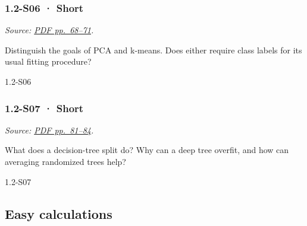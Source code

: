 \noindent\begin{minipage}{\linewidth}

\subsubsection{1.2-S06 · Short}\label{s06-short-1}

\emph{Source:
\href{../Lecture\%20Slides/1.2.\%20Shallow\%20Learning.pdf\#page=68}{PDF
pp.~68--71}.}

Distinguish the goals of PCA and k-means. Does either require class
labels for its usual fitting procedure?

\begin{solution}[20mm]{1.2-S06}

\end{solution}
\end{minipage}\par\medskip

\noindent\begin{minipage}{\linewidth}

\subsubsection{1.2-S07 · Short}\label{s07-short-1}

\emph{Source:
\href{../Lecture\%20Slides/1.2.\%20Shallow\%20Learning.pdf\#page=81}{PDF
pp.~81--84}.}

What does a decision-tree split do? Why can a deep tree overfit, and how
can averaging randomized trees help?

\begin{solution}[20mm]{1.2-S07}

\end{solution}
\end{minipage}\par\medskip

\subsection{Easy calculations}\label{easy-calculations-1}

